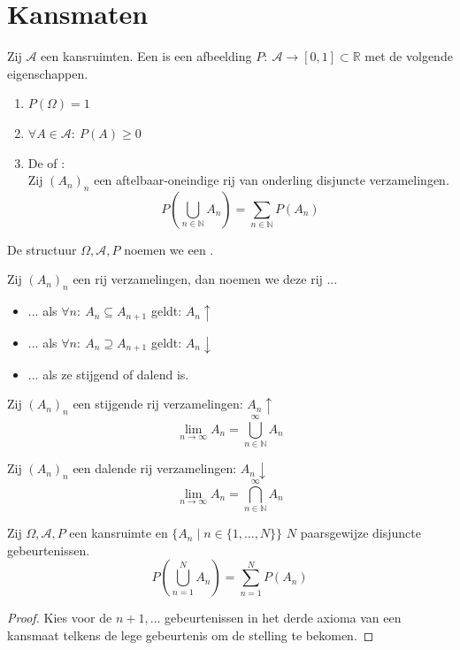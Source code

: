 \documentclass[main.tex]{subfiles}
\begin{document}
\section{Kansmaten}
\label{sec:kansmaten}

\begin{de}
  Zij $\mathcal{A}$ een kansruimten.
  Een  is een afbeelding $P:\ \mathcal{A} \rightarrow [0,1] \subset \mathbb{R}$ met de volgende eigenschappen.
  \begin{enumerate}
  \item $P(\Omega) = 1$
  \item $\forall A \in \mathcal{A}:\ P(A) \ge 0$
  \item De  of :\\
    Zij $(A_{n})_{n}$ een aftelbaar-oneindige rij van onderling disjuncte verzamelingen.
    \[ P\left( \bigcup_{n\in\mathbb{N}}A_{n} \right) = \sum_{n\in\mathbb{N}}P(A_{n}) \]
  \end{enumerate}
  De structuur $\Omega,\mathcal{A},P$ noemen we een .
\end{de} 

\begin{de}
  Zij $(A_{n})_{n}$ een rij verzamelingen, dan noemen we deze rij ...
  \begin{itemize}
  \item ...  als $\forall n:\ A_{n}\subseteq A_{n+1}$ geldt: $A_{n}\uparrow$
  \item ...  als $\forall n:\ A_{n}\supseteq A_{n+1}$ geldt: $A_{n}\downarrow$
  \item ...  als ze stijgend of dalend is.
  \end{itemize}
\end{de}

\begin{de}
  Zij $(A_{n})_{n}$ een stijgende rij verzamelingen: $A_{n} \uparrow$
  \[ \lim_{n\rightarrow \infty}A_{n} = \bigcup_{n\in \mathbb{N}}^{\infty}A_{n} \]
\end{de}

\begin{de}
  Zij $(A_{n})_{n}$ een dalende rij verzamelingen: $A_{n} \downarrow$
  \[ \lim_{n\rightarrow \infty}A_{n} = \bigcap_{n\in \mathbb{N}}^{\infty}A_{n} \]
\end{de}


\begin{st}
  \label{st:kansmaat-eindige-additiviteit}
  Zij $\Omega,\mathcal{A},P$ een kansruimte en $\{ A_{n} \mid n\in \{ 1,\dotsc,N\} \}$ $N$ paarsgewijze disjuncte gebeurtenissen.
  \[ P\left( \bigcup_{n=1}^{N}A_{n}\right) = \sum_{n=1}^{N}P(A_{n}) \]

  \begin{proof}
    Kies voor de $n+1,\dotsc$ gebeurtenissen in het derde axioma van een kansmaat telkens de lege gebeurtenis om de stelling te bekomen.
  \end{proof}
\end{st}
\end{document}
